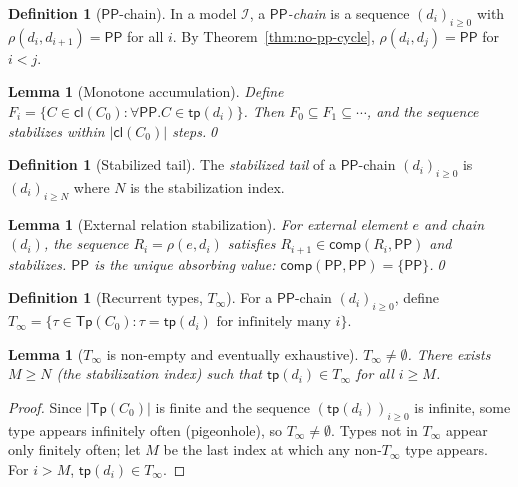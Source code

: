 \documentclass[a4paper,11pt]{article}
\newtheorem{lemma}[theorem]{Lemma}
\theoremstyle{definition}
\newtheorem{definition}[theorem]{Definition}
\newcommand{\PP}{\ensuremath{\mathsf{PP}}}
\newcommand{\comp}{\ensuremath{\mathsf{comp}}}
\newcommand{\cl}{\ensuremath{\mathsf{cl}}}
\newcommand{\tp}{\ensuremath{\mathsf{tp}}}
\newcommand{\Tp}{\ensuremath{\mathsf{Tp}}}
\newcommand{\interp}{\ensuremath{\mathcal{I}}}
\begin{document}
\begin{definition}[$\PP$-chain]
In a model $\interp$, a \emph{$\PP$-chain} is a sequence
$(d_i)_{i \ge 0}$ with $\rho(d_i, d_{i+1}) = \PP$ for all $i$.
By Theorem~\ref{thm:no-pp-cycle}, $\rho(d_i, d_j) = \PP$ for $i < j$.
\end{definition}

\begin{lemma}[Monotone accumulation]\label{lem:monotone}
Define $F_i = \{C \in \cl(C_0) : \forall\PP.C \in \tp(d_i)\}$.
Then $F_0 \subseteq F_1 \subseteq \cdots$, and the sequence
stabilizes within $|\cl(C_0)|$ steps.\qed
\end{lemma}

\begin{definition}[Stabilized tail]
The \emph{stabilized tail} of a $\PP$-chain $(d_i)_{i \ge 0}$ is
$(d_i)_{i \ge N}$ where $N$ is the stabilization index.
\end{definition}

\begin{lemma}[External relation stabilization]\label{lem:external}
For external element $e$ and chain $(d_i)$, the sequence
$R_i = \rho(e, d_i)$ satisfies $R_{i+1} \in \comp(R_i, \PP)$
and stabilizes.  $\PP$ is the unique absorbing value:
$\comp(\PP, \PP) = \{\PP\}$.\qed
\end{lemma}

\begin{definition}[Recurrent types, $T_\infty$]\label{def:tinf}
For a $\PP$-chain $(d_i)_{i \ge 0}$, define
$T_\infty = \{\tau \in \Tp(C_0) : \tau = \tp(d_i) \text{ for
infinitely many } i\}$.
\end{definition}

\begin{lemma}[$T_\infty$ is non-empty and eventually
exhaustive]\label{lem:tinf}
$T_\infty \ne \emptyset$.  There exists $M \ge N$ (the stabilization
index) such that $\tp(d_i) \in T_\infty$ for all $i \ge M$.
\end{lemma}

\begin{proof}
Since $|\Tp(C_0)|$ is finite and the sequence $(\tp(d_i))_{i \ge 0}$
is infinite, some type appears infinitely often (pigeonhole), so
$T_\infty \ne \emptyset$.  Types not in $T_\infty$ appear only
finitely often; let $M$ be the last index at which any
non-$T_\infty$ type appears.  For $i > M$, $\tp(d_i) \in T_\infty$.
\end{proof}


\end{document}

